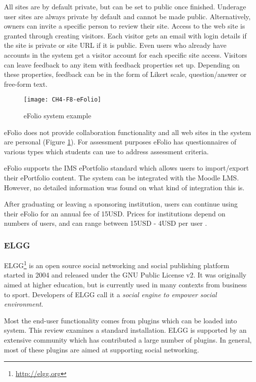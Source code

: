 All sites are by default private, but can be set to public once finished.
Underage user sites are always private by default and cannot be made public.
Alternatively, owners can invite a specific person to review their site. Access
to the web site is granted through creating visitors. Each visitor gets an email
with login details if the site is private or site URL if it is public. Even
users who already have accounts in the system get a visitor account for each
specific site access. Visitors can leave feedback to any item with feedback
properties set up. Depending on these properties, feedback can be in the form of
Likert scale, question/answer or free-form text.

\begin{figure}[htb]
\centering
\setlength\fboxsep{0pt}
\setlength\fboxrule{0.5pt}
\texttt{[image: CH4-F8-eFolio]}
\caption[eFolio system example]{eFolio system example \citep{EFolioMinnesota2011}}
\label{fig:efolio}
\end{figure}

eFolio does not provide collaboration functionality and all web sites in the
system are personal (Figure \ref{fig:efolio}). For assessment purposes eFolio
has questionnaires of various types which students can use to address assessment
criteria.

eFolio supports the IMS ePortfolio standard which allows users to import/export
their ePortfolio content. The system can be integrated with the Moodle LMS.
However, no detailed information was found on what kind of integration this is.

After graduating or leaving a sponsoring institution, users can continue
using their eFolio for an annual fee of 15USD. Prices for institutions depend
on numbers of users, and can range between 15USD - 4USD per user
\citep{AAEEBL2011}.

\subsubsection{ELGG}
ELGG\footnote{\url{http://elgg.org}} is an open source social networking and
social publishing platform started in 2004 and released under the GNU Public
License v2. It was originally aimed at higher education, but is currently used
in many contexts from business to sport. Developers of ELGG call it a
\textit{social engine to empower social environment}.

Most the end-user functionality comes from plugins which can be loaded into
system. This review examines a standard installation. ELGG is supported by an
extensive community which has contributed a large number of plugins. In
general, most of these plugins are aimed at supporting social networking.

